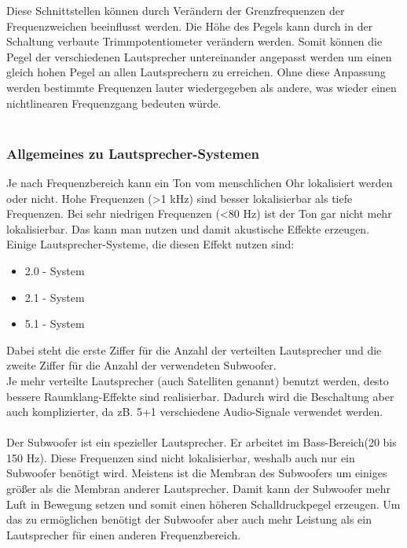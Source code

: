 Diese Schnittstellen können durch Verändern der Grenzfrequenzen der Frequenzweichen beeinflusst werden.
Die Höhe des Pegels kann durch in der Schaltung verbaute Trimmpotentiometer verändern werden.
Somit können die Pegel der verschiedenen Lautsprecher untereinander angepasst werden um einen gleich hohen Pegel an allen Lautsprechern zu erreichen.
Ohne diese Anpassung werden bestimmte Frequenzen lauter wiedergegeben als andere, was wieder einen nichtlinearen Frequenzgang bedeuten würde.\\ \\

\subsubsection*{Allgemeines zu Lautsprecher-Systemen}
Je nach Frequenzbereich kann ein Ton vom menschlichen Ohr lokalisiert \mbox{werden} oder nicht.
Hohe Frequenzen (>1 kHz) sind besser lokalisierbar als tiefe Frequenzen.
Bei sehr niedrigen Frequenzen (<80 Hz) ist der Ton gar nicht mehr lokalisierbar. %
Das kann man nutzen und damit akustische Effekte erzeugen.
Einige Lautsprecher-Systeme, die diesen Effekt nutzen sind:
\begin{itemize}
	\item 2.0 - System
	\item 2.1 - System
	\item 5.1 - System
\end{itemize}
Dabei steht die erste Ziffer für die Anzahl der verteilten Lautsprecher und die zweite Ziffer für die Anzahl der verwendeten Subwoofer.
\\
Je mehr verteilte Lautsprecher (auch Satelliten genannt) benutzt werden, desto bessere Raumklang-Effekte sind realisierbar.
Dadurch wird die Beschaltung aber auch komplizierter, da zB. 5+1 verschiedene Audio-Signale verwendet werden.
\\ \\
Der Subwoofer ist ein spezieller Lautsprecher.
Er arbeitet im Bass-Bereich(20 bis 150 Hz).
Diese Frequenzen sind nicht lokalisierbar, weshalb auch nur ein Subwoofer benötigt wird.
Meistens ist die Membran des Subwoofers um einiges größer als die Membran anderer Lautsprecher.
Damit kann der Subwoofer mehr Luft in Bewegung setzen und somit einen höheren Schalldruckpegel erzeugen.
Um das zu ermöglichen benötigt der Subwoofer aber auch mehr Leistung als ein Lautsprecher für einen anderen Frequenzbereich.
\\ \\

